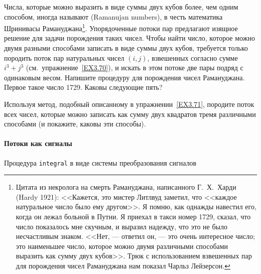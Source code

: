\begin{exercise}{3.71}\label{EX3.71}%
Числа, которые можно выразить в виде суммы двух кубов
более, чем одним способом, иногда называют
 (Ramanujan numbers), в честь
математика Шринивасы Рамануджана\footnote{Цитата из некролога на
  смерть Рамануджана,
написанного Г.~Х.~Харди  (Hardy 1921):
<<Кажется, это мистер Литлвуд заметил, что <<каждое натуральное число было ему
другом>>. Я помню, как однажды навестил его, когда он лежал больной в
Путни.  Я приехал в такси номер 1729, сказал, что число показалось
мне скучным, и выразил надежду, что это не было несчастливым
знаком. <<Нет, --- ответил он, --- это очень интересное число; это
наименьшее число, которое можно двумя различными способами выразить как
сумму двух кубов>>. Трюк с использованием взвешенных пар для
порождения чисел Рамануджана нам показал Чарльз Лейзерсон.}.
Упорядоченные потоки пар предлагают изящное решение для задачи
порождения таких чисел.  Чтобы найти число, которое можно двумя
разными способами записать в виде суммы двух кубов, требуется только
породить поток пар натуральных чисел $(i,j)$, взвешенных
согласно сумме $i^3 + j^3$
(см.~упражнение~\ref{EX3.70}), и искать в этом потоке две
пары подряд с одинаковым весом.  Напишите процедуру для порождения
чисел Рамануджана.  Первое такое число 1729.  Каковы следующие
пять?
\end{exercise}
\begin{exercise}{3.72}\label{EX3.72}%
Используя метод, подобный описанному в
упражнении~\ref{EX3.71}, породите поток всех чисел,
которые можно
записать как сумму двух квадратов тремя различными способами (и
покажите, каковы эти способы).
\end{exercise}

\paragraph{Потоки как сигналы}



\begin{cntrfig}

\caption{Процедура {\tt integral} в виде
системы преобразования сигналов}
\label{P3.32}

\end{cntrfig}

